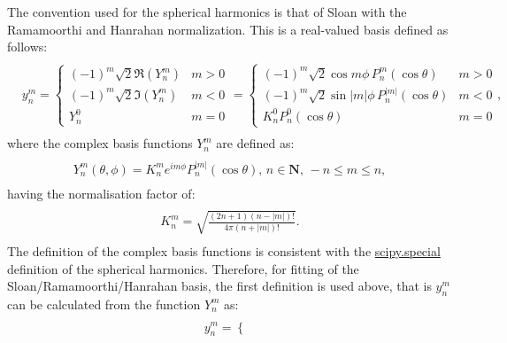 \documentclass[a4paper,10pt,english]{sphinxmanual}
\begin{document}
\begin{fulllineitems}
\begin{fulllineitems}
The convention used for the spherical harmonics is that of Sloan with the Ramamoorthi and Hanrahan
normalization. This is a real-valued basis defined as follows:
\begin{align*}\begin{aligned}
\begin{split}y_{n}^{m}=\begin{cases}
(-1)^{m}\sqrt{2}\Re(Y_{n}^{m}) & m>0\\
(-1)^{m}\sqrt{2}\Im(Y_{n}^{m}) & m<0\\
Y_{n}^{0} & m=0
\end{cases}=\begin{cases}
(-1)^{m}\sqrt{2}\cos m\phi\,P_{n}^{m}(\cos\theta) & m>0\\
(-1)^{m}\sqrt{2}\sin|m|\phi\,P_{n}^{|m|}(\cos\theta) & m<0\\
K_{n}^{0}P_{n}^{0}(\cos\theta) & m=0
\end{cases},\end{split}\end{aligned}\end{align*}
where the complex basis functions \(Y^{m}_{n}\) are defined as:
\begin{align*}\begin{aligned}
\begin{split}Y_{n}^{m}(\theta,\phi)=K_{n}^{m}e^{im\phi}P_{n}^{|m|}(\cos\theta),\,n\in\mathbf{N},\,-n\leq m\leq n,\end{split}\end{aligned}\end{align*}
having the normalisation factor of:
\begin{align*}\begin{aligned}
\begin{split}K_{n}^{m}=\sqrt{\frac{(2n+1)(n-|m|)!}{4\pi(n+|m|)!}}.\end{split}\end{aligned}\end{align*}
The definition of the complex basis functions is consistent with the
\href{http://docs.scipy.org/doc/scipy-0.16.0/reference/generated/scipy.special.sph\_harm.html}{scipy.special}
definition of the spherical harmonics. Therefore, for fitting of the Sloan/Ramamoorthi/Hanrahan basis, the
first definition is used above, that is \(y_{n}^{m}\) can be calculated from the  function
\(Y_{n}^{m}\) as:
\begin{align*}\begin{aligned}
\begin{split}y_{n}^{m}=\begin{cases}

\end{cases}
\end{split}
\end{aligned}
\end{align*}
\end{fulllineitems}
\end{fulllineitems}
\end{document}
